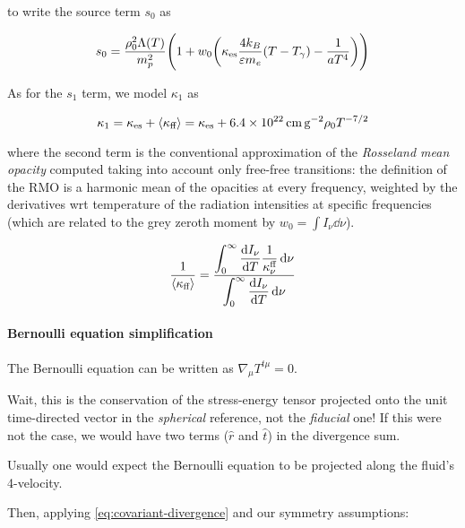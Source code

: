 \documentclass[main.tex]{subfiles}
\begin{document}
to write the source term \(s_0\) as

\begin{equation}
    s_0 = \frac{\rho_0^2 \Lambda (T)}{m_p^2} \qty(1 + w_0 \qty(\kappa_{\text{es}} \frac{4 k_B}{\varepsilon m_e} (T - T_\gamma) - \frac{1}{aT^4}))
\end{equation}

As for the \(s_1\) term, we model \(\kappa_1\) as

\begin{equation}
  \kappa_1 = \kappa_{\text{es}} + \expval{\kappa_{\text{ff}}}
  = \kappa_{\text{es}} + \SI{6.4e22}{\centi\metre\square\per\gram} \rho_0 T^{-7/2}
\end{equation}

where the second term is the conventional approximation of the \emph{Rosseland mean opacity} computed taking into account only free-free transitions: the definition of the RMO is a harmonic mean of the opacities at every frequency, weighted by the derivatives wrt temperature of the radiation intensities at specific frequencies (which are related to the grey zeroth moment by \(w_0 = \int I_\nu \dd{\nu}\)).

\begin{equation}
  \frac{1}{\expval{\kappa_{\text{ff}}}} =
  \frac{ \displaystyle\int _{0}   ^{\infty}  \dv{I_\nu}{T} \frac{1}{\kappa_\nu^{\text{ff}}} \dd{\nu}}
  {  \displaystyle \int _{0}   ^{\infty} \dv{I_\nu}{T} \dd{\nu}}
\end{equation}


\paragraph{Bernoulli equation simplification}

The Bernoulli equation can be written as \(\nabla_\mu T^{t\mu} = 0\).

\begin{greenbox}
  Wait, this is the conservation of the stress-energy tensor projected onto the unit time-directed vector in the \emph{spherical} reference, not the \emph{fiducial} one! If this were not the case, we would have two terms (\(\hat{r}\) and \(\hat{t}\)) in the divergence sum.

  Usually one would expect the Bernoulli equation to be projected along the fluid's 4-velocity.
\end{greenbox}

Then, applying \eqref{eq:covariant-divergence} and our symmetry assumptions:
\end{document}
